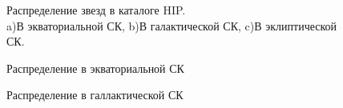 \documentclass[14pt,aspectratio=43]{beamer}
\begin{document}
\begin{frame}[<alignment>]
\begin{figure}[H]
\begin{minipage}[h]{0.47\linewidth}
\end{minipage}
\hfill
\begin{minipage}[h]{0.47\linewidth}
Распределение звезд в каталоге HIP.\\
a)В экваториальной СК, b)В галактической СК, c)В эклиптической СК.
\end{minipage}
\label{ris:experimentalcorrelationsignals}
\end{figure}

\end{frame}	

\begin{frame}[<alignment>]
\begin{figure}[h!]
\caption{Распределение в экваториальной СК}
\label{img:hiptgasra}
\end{figure}
\end{frame}	

\begin{frame}[<alignment>]
\begin{figure}[h!]
\caption{Распределение в галлактической СК}
\label{img:hiptgasl}
\end{figure}
\end{frame}	
\end{document}
